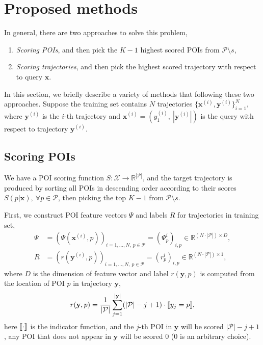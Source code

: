 \section{Proposed methods}
\label{sec:methods}

In general, there are two approaches to solve this problem,
\begin{enumerate}
\item \emph{Scoring POIs}, and then pick the $K-1$ highest scored POIs from $\mathcal{P} \setminus s$,
\item \emph{Scoring trajectories}, and then pick the highest scored trajectory with respect to query $\mathbf{x}$.
\end{enumerate}

In this section, we briefly describe a variety of methods that following these two approaches.
Suppose the training set contains $N$ trajectories 
$\{ \mathbf{x}^{(i)}, \mathbf{y}^{(i)} \}_{i=1}^N$,
where $\mathbf{y}^{(i)}$ is the $i$-th trajectory and $\mathbf{x}^{(i)} = (y_1^{(i)},~ | \mathbf{y}^{(i)} |)$ is the query 
with respect to trajectory $\mathbf{y}^{(i)}$.



\subsection{Scoring POIs}
\label{sec:scoring_point}

We have a POI scoring function $S: \mathcal{X} \to \mathbb{R}^{| \mathcal{P} |}$, 
and the target trajectory is produced by sorting all POIs in descending order according to their scores 
$S(p | \mathbf{x}),~ \forall p \in \mathcal{P}$,
then picking the top $K-1$ from $\mathcal{P} \setminus s$.

First, we construct POI feature vectors $\Psi$ and labels $R$ for trajectories in training set, 
\begin{align*}
\Psi &= \left( \Psi(\mathbf{x}^{(i)}, p) \right)_{i=1,\dots,N,~p \in \mathcal{P}} = \left( \Psi_p^i \right)_{i,p}
        \in \mathbb{R}^{(N \cdot | \mathcal{P} |) \times D}, \\
   R &= \left( r(\mathbf{y}^{(i)}, p) \right)_{i=1,\dots,N,~p \in \mathcal{P}} = \left(r_p^i \right)_{i,p}
        \in \mathbb{R}^{(N \cdot | \mathcal{P} |) \times 1},
\end{align*}
where $D$ is the dimension of feature vector and label $r(\mathbf{y}, p)$ is computed from the location of POI $p$ in trajectory $\mathbf{y}$,
\begin{equation*}
r(\mathbf{y}, p) = \frac{1}{| \mathcal{P} |} 
                   \sum_{j=1}^{| \mathbf{y} |} (| \mathcal{P} | - j + 1) \cdot \llbracket y_j = p \rrbracket,
\end{equation*}
here $\llbracket \cdot \rrbracket$ is the indicator function, and the $j$-th POI in $\mathbf{y}$ will be scored $| \mathcal{P} | - j + 1$, 
any POI that does not appear in $\mathbf{y}$ will be scored $0$ ($0$ is an arbitrary choice).



